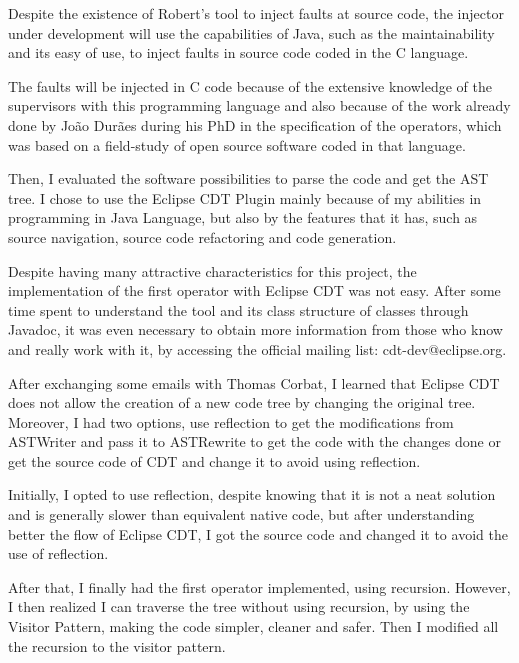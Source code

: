 Despite the existence of Robert's tool to inject faults at source code, the injector under development will use the capabilities of Java, such as the maintainability and its easy of use, to inject faults in source code coded in the C language.

The faults will be injected in C code because of the extensive knowledge of the supervisors with this programming language and also because of the work already done by João Durães during his PhD in the specification of the operators, which was based on a field-study of open source software coded in that language.

Then, I evaluated the software possibilities to parse the code and get the AST tree. I chose to use the Eclipse CDT Plugin mainly because of my abilities in programming in Java Language, but also by the features that it has, such as source navigation, source code refactoring and code generation.

Despite having many attractive characteristics for this project, the implementation of the first operator with Eclipse CDT was not easy. After some time spent to understand the tool and its class structure of classes through Javadoc, it was even necessary to obtain more information from those who know and really work with it, by accessing the official mailing list: cdt-dev@eclipse.org.

After exchanging some emails with Thomas Corbat, I learned that Eclipse CDT does not allow the creation of a new code tree by changing the original tree. Moreover, I had two options, use reflection to get the modifications from ASTWriter and pass it to ASTRewrite to get the code with the changes done or get the source code of CDT and change it to avoid using reflection.

Initially, I opted to use reflection, despite knowing that it is not a neat solution and is generally slower than equivalent native code, but after understanding better the flow of Eclipse CDT, I got the source code and changed it to avoid the use of reflection.

After that, I finally had the first operator implemented, using recursion. However, I then realized I can traverse the tree without using recursion, by using the Visitor Pattern, making the code simpler, cleaner and safer. Then I modified all the recursion to the visitor pattern.





